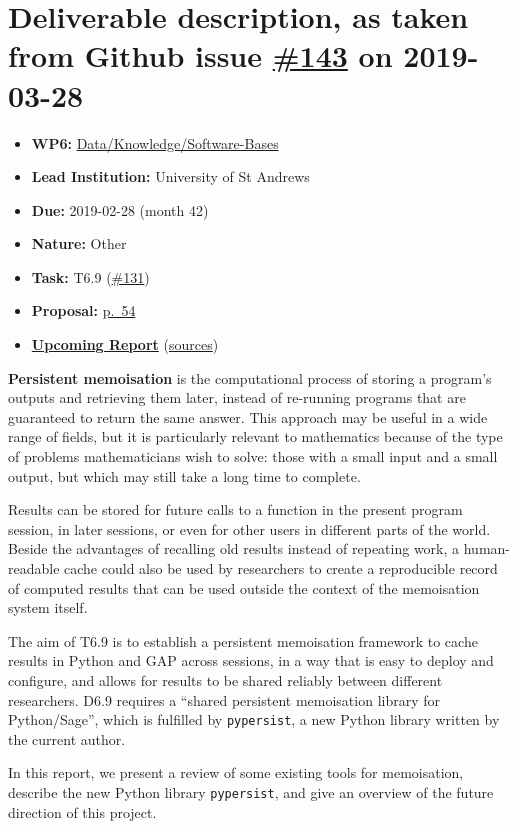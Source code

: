 \section*{\texorpdfstring{Deliverable description, as taken from Github
issue
\href{https://github.com/OpenDreamKit/OpenDreamKit/issues/143}{\#143} on
2019-03-28}{Deliverable description, as taken from Github issue \#143 on 2019-03-28}}\label{deliverable-description-as-taken-from-github-issue-143-on-2019-03-28}

\begin{itemize}
\tightlist
\item
  \textbf{WP6:}
  \href{https://github.com/OpenDreamKit/OpenDreamKit/tree/master/WP6}{Data/Knowledge/Software-Bases}
\item
  \textbf{Lead Institution:} University of St Andrews
\item
  \textbf{Due:} 2019-02-28 (month 42)
\item
  \textbf{Nature:} Other
\item
  \textbf{Task:} T6.9
  (\href{https://github.com/OpenDreamKit/OpenDreamKit/issues/131}{\#131})
\item
  \textbf{Proposal:}
  \href{https://github.com/OpenDreamKit/OpenDreamKit/raw/master/Proposal/proposal-www.pdf}{p.~54}
\item
  \textbf{\href{https://github.com/OpenDreamKit/OpenDreamKit/raw/master/WP6/D6.9/report-final.pdf}{Upcoming
  Report}}
  (\href{https://github.com/OpenDreamKit/OpenDreamKit/raw/master/WP6/D6.9/}{sources})
\end{itemize}

\textbf{Persistent memoisation} is the computational process of storing
a program's outputs and retrieving them later, instead of re-running
programs that are guaranteed to return the same answer. This approach
may be useful in a wide range of fields, but it is particularly relevant
to mathematics because of the type of problems mathematicians wish to
solve: those with a small input and a small output, but which may still
take a long time to complete.

Results can be stored for future calls to a function in the present
program session, in later sessions, or even for other users in different
parts of the world. Beside the advantages of recalling old results
instead of repeating work, a human-readable cache could also be used by
researchers to create a reproducible record of computed results that can
be used outside the context of the memoisation system itself.

The aim of T6.9 is to establish a persistent memoisation framework to
cache results in Python and GAP across sessions, in a way that is easy
to deploy and configure, and allows for results to be shared reliably
between different researchers. D6.9 requires a ``shared persistent
memoisation library for Python/Sage'', which is fulfilled by
\texttt{pypersist}, a new Python library written by the current author.

In this report, we present a review of some existing tools for
memoisation, describe the new Python library \texttt{pypersist}, and
give an overview of the future direction of this project.
